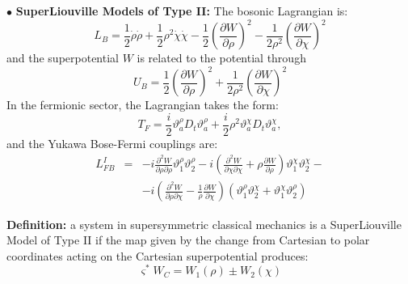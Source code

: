 \documentclass[a4paper,11pt,twoside]{article}
\begin{document}
\noindent $\bullet$ {\bf SuperLiouville Models of Type II:} The
bosonic Lagrangian is:
\[
L_B= \displaystyle\frac{1}{2}
\dot{\rho} \dot{\rho} + \frac{1}{2} \rho^2  \dot\chi \dot\chi -
\displaystyle\frac{1}{2} \left( \displaystyle\frac{\partial
W}{\partial \rho} \right)^2 -\frac{1}{2 \rho^2} \left(
\displaystyle\frac{\partial W}{\partial \chi} \right)^2
\]
and the superpotential $W$ is related to the potential through
\[
U_{B}= \displaystyle\frac{1}{2} \left( \displaystyle\frac{\partial
W}{\partial \rho} \right)^2+ \frac{1}{2 \rho^2}\left(
\displaystyle\frac{\partial W}{\partial \chi} \right)^2
\]
In the fermionic sector, the Lagrangian takes the form:
\[
T_F=\frac{i}{2} \vartheta_a^{\rho} D_t \vartheta_a^{\rho}+
\frac{i}{2} \rho^2 \vartheta_a^\chi  D_t \vartheta_a^\chi ,
\]
and the Yukawa Bose-Fermi couplings are:
\begin{eqnarray*}
{L}_{FB}^I&=& -i \frac{\partial^2 W}{\partial \rho \partial \rho} \vartheta_1^\rho \vartheta_2^\rho- i \left( \frac{\partial^2 W}{\partial \chi \partial \chi} +\rho \frac{\partial W}{\partial \rho} \right) \vartheta_1^\chi\vartheta_2^\chi-\\
& &  -i \left( \frac{\partial^2 W}{\partial \rho \partial \chi} -\displaystyle\frac{1}{\rho} \frac{\partial W}{\partial \chi} \right) (\vartheta_1^\rho \vartheta_2^\chi+\vartheta_1^\chi
\vartheta_2^\rho )
\end{eqnarray*}

{\bf Definition:} a system in supersymmetric classical mechanics
is a SuperLiouville Model of Type II if the map given by the
change from Cartesian to polar coordinates acting on the Cartesian
superpotential produces:
\[
\varsigma^{*} W_C= W_1(\rho)\pm W_2(\chi)
\]

\vspace*{0.1cm}
\end{document}

